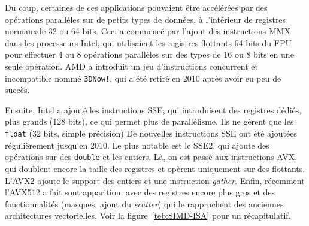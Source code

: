 Du coup, certaines de ces applications pouvaient être accélérées par des
opérations parallèles sur de petits types de données, à l'intérieur de registres
\og normaux\fg de 32 ou 64 bits. Ceci a commencé par l'ajout des instructions
MMX dans les processeurs Intel, qui utilisaient les registres flottants 64 bits
du FPU pour effectuer 4 ou 8 opérations parallèles sur des types de 16 ou 8 bits
en une seule opération. AMD a introduit un jeu d'instructions concurrent et
incompatible nommé \verb|3DNow!|, qui a été retiré en 2010 après avoir eu peu de
succès.

Ensuite, Intel a ajouté les instructions SSE, qui introduisent des registres
dédiés, plus grands (128 bits), ce qui permet plus de parallélisme. Ils ne
gèrent que les \texttt{float} (32 bits, simple précision) De nouvelles
instructions SSE ont été ajoutées régulièrement jusqu'en 2010. Le plus notable
est le SSE2, qui ajoute des opérations sur des \texttt{double} et les
entiers. Là, on est passé aux instructions AVX, qui doublent encore la taille
des registres et opèrent uniquement sur des flottants. L'AVX2 ajoute le support
des entiers et une instruction \emph{gather}. Enfin, récemment l'AVX512 a fait
sont apparition, avec des registres encore plus gros et des fonctionnalités
(masques, ajout du \emph{scatter}) qui le rapprochent des anciennes
architectures vectorielles. Voir la figure~\ref{teb:SIMD-ISA} pour un
récapitulatif.

